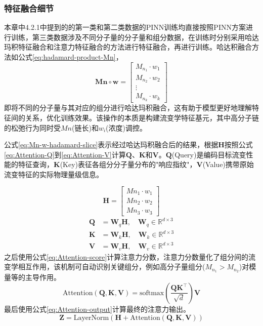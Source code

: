 \subsubsection{特征融合细节}
本章中4.2.1中提到的的第一类和第二类数据的PINN训练均直接按照PINN方案进行训练，第三类数据涉及不同分子量的分子量和组分数据，在训练时分别采用哈达玛积特征融合和注意力特征融合的方法进行特征融合，再进行训练。哈达积融合方法如公式\eqref{eq:hadamard-product-Mn}，
\begin{equation}
  \mathbf{Mn} \circ \mathbf{w} =
  \begin{bmatrix}
    M_{n_1} \cdot w_1 \\
    M_{n_2} \cdot w_2 \\
    \vdots            \\
    M_{n_k} \cdot w_k
  \end{bmatrix} \label{eq:hadamard-product-Mn}
\end{equation}
即将不同的分子量与其对应的组分进行哈达玛积融合，这有助于模型更好地理解特征间的关系，优化训练效果。该操作的本质是构建流变学特征基元，其中高分子链的松弛行为同时受$Mn$(链长)和$w_i$(浓度)调控。

公式\eqref{eq:Mn-w-hadamard-slice}表示经过哈达玛积融合后的结果，根据$\mathbf{H}$按照公式\eqref{eq:Attention-Q}到\eqref{eq:Attention-V}计算$\mathbf{Q}$、$\mathbf{K}$和$\mathbf{V}$。$\mathbf{Q}$(Query)是编码目标流变性能的特征查询，$\mathbf{K}$(Key)表征各组分分子量分布的"响应指纹"，$\mathbf{V}$(Value)携带原始流变特征的实际物理量级信息。

\begin{equation}
  \mathbf{H} =
  \begin{bmatrix}
    Mn_{1} \cdot w_1 \\
    Mn_{2} \cdot w_2 \\
    Mn_{3} \cdot w_3
  \end{bmatrix} \label{eq:Mn-w-hadamard-slice}
\end{equation}
\begin{align}
  \mathbf{Q} & = \mathbf{W}_q \mathbf{H}, \quad \mathbf{W}_q \in \mathbb{R}^{d \times 3}  \label{eq:Attention-Q} \\
  \mathbf{K} & = \mathbf{W}_k \mathbf{H}, \quad \mathbf{W}_k \in \mathbb{R}^{d \times 3} \label{eq:Attention-K}  \\
  \mathbf{V} & = \mathbf{W}_v \mathbf{H}, \quad \mathbf{W}_v \in \mathbb{R}^{d \times 3} \label{eq:Attention-V}
\end{align}
之后使用公式\eqref{eq:Attention-score}计算注意力分数，注意力分数量化了组分间的流变学相互作用，该机制可自动识别关键组分，例如高分子量组分($M_{n_1} > M_{n_2}$)对模量等的主导作用。
\begin{equation}
  \text{Attention}(\mathbf{Q}, \mathbf{K}, \mathbf{V}) = \text{softmax}\left(\frac{\mathbf{Q} \mathbf{K}^\top}{\sqrt{d}}\right) \mathbf{V} \label{eq:Attention-score}
\end{equation}
最后使用公式\eqref{eq:Attention-output}计算最终的注意力输出。
\begin{equation}
  \mathbf{Z} = \text{LayerNorm}(\mathbf{H} + \text{Attention}(\mathbf{Q}, \mathbf{K}, \mathbf{V}))
  \label{eq:Attention-output}
\end{equation}

